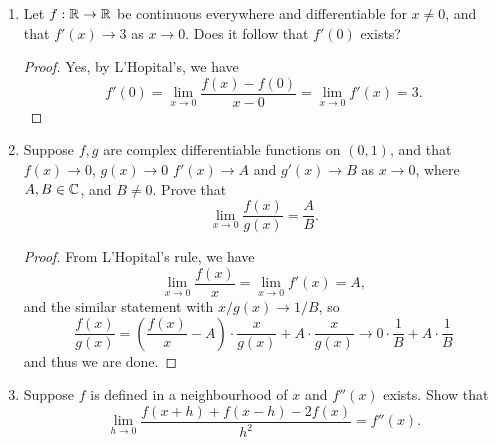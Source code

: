 \begin{enumerate}[1.]
    \begin{proof}
        Notice that $f'$ is continuous on a compact domain and thus uniformly continous. Then, we can select $\delta > 0$ such that $|f'(y) - f'(x)| < \epsilon$ whenever $|x - y| < \delta$. Let $x, t \in [a, b]$ such that $|t - x| < \delta$. Then, for some $z$ between $x$ and $t$, we have
        \[
            \left|\frac{f(t) - f(x)}{t - x} - f'(x) \right| = \left|f'(z) - f'(z) \right| < \epsilon
        \]
        since $z$ is between $t$ and $x$ and thus at most as close to $x$ as $t$ is, ie. $\delta$ away. This proves the result. If $f$ is vector-valued, applying the above result to each component and recombining iyields the result for vector-valued functions.
    \end{proof}

\item %
    Let $f: \mathbb{R} \rightarrow \mathbb{R}$ be continuous everywhere and differentiable for $x \ne 0$, and that $f'(x) \to 3$ as $x \to 0$. Does it follow that $f'(0)$ exists?

    \begin{proof}
        Yes, by L'Hopital's, we have
        \[
            f'(0) = \lim_{x \to 0} \frac{f(x) - f(0)}{x - 0} = \lim_{x \to 0} f'(x) = 3.
        \]
    \end{proof}
\item %
    Suppose $f, g$ are complex differentiable functions on $(0, 1)$, and that $f(x) \to 0$, $g(x) \to 0$ $f'(x) \to A$ and $g'(x) \to B$ as $x \to 0$, where $A, B \in \mathbb{C}$, and $B \ne 0$. Prove that
    \[
        \lim_{x \to 0} \frac{f(x)}{g(x)} = \frac{A}{B}.
    \]

    \begin{proof}
        From L'Hopital's rule, we have 
        \[
            \lim_{x \to 0} \frac{f(x)}{x} = \lim_{x \to 0} f'(x) = A,
        \]
        and the similar statement with $x/g(x) \to 1/B$, so
        \[
            \frac{f(x)}{g(x)} = \left( \frac{f(x)}{x} - A \right) \cdot \frac{x}{g(x)} + A \cdot \frac{x}{g(x)} \to 0 \cdot \frac{1}{B} + A \cdot \frac{1}{B}
        \]
        and thus we are done.
    \end{proof}
\item %
    Suppose $f$ is defined in a neighbourhood of $x$ and $f''(x)$ exists. Show that
    \[
        \lim_{h \to 0} \frac{f(x + h) + f(x - h) - 2f(x)}{h^2} = f''(x).
    \]


\end{enumerate}
